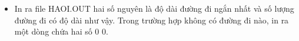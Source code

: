 \begin{itemize}
	\item In ra file HAOI.OUT hai số nguyên là độ dài đường đi ngắn nhất và số lượng đường đi có độ dài như vậy. Trong trường hợp không có đường đi nào, in ra một dòng chứa hai số 0 0.
\end{itemize}